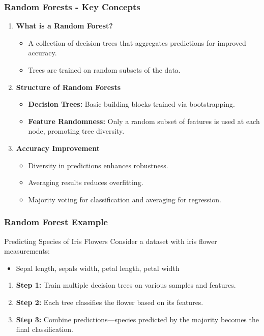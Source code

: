 \documentclass[aspectratio=169]{beamer}
\begin{document}
\begin{frame}[fragile]
    \frametitle{Random Forests - Key Concepts}
    \begin{enumerate}
        \item \textbf{What is a Random Forest?}
            \begin{itemize}
                \item A collection of decision trees that aggregates predictions for improved accuracy.
                \item Trees are trained on random subsets of the data.
            \end{itemize}
        
        \item \textbf{Structure of Random Forests}
            \begin{itemize}
                \item \textbf{Decision Trees:} Basic building blocks trained via bootstrapping.
                \item \textbf{Feature Randomness:} Only a random subset of features is used at each node, promoting tree diversity.
            \end{itemize}
        
        \item \textbf{Accuracy Improvement}
            \begin{itemize}
                \item Diversity in predictions enhances robustness.
                \item Averaging results reduces overfitting.
                \item Majority voting for classification and averaging for regression.
            \end{itemize}
    \end{enumerate}
\end{frame}

\begin{frame}[fragile]
    \frametitle{Random Forest Example}
    \begin{block}{Predicting Species of Iris Flowers}
        Consider a dataset with iris flower measurements:
        \begin{itemize}
            \item Sepal length, sepals width, petal length, petal width
        \end{itemize}
        \begin{enumerate}
            \item \textbf{Step 1:} Train multiple decision trees on various samples and features.
            \item \textbf{Step 2:} Each tree classifies the flower based on its features.
            \item \textbf{Step 3:} Combine predictions—species predicted by the majority becomes the final classification.
        \end{enumerate}
    \end{block}
\end{frame}
\end{document}
